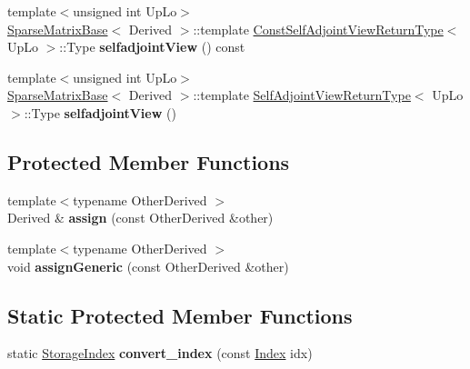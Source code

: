 \begin{DoxyCompactItemize}
\item 
\mbox{\label{class_eigen_1_1_sparse_matrix_base_aa3d27327f5290f7939904557ee81b349}} 
{\footnotesize template$<$unsigned int Up\+Lo$>$ }\\\mbox{\hyperlink{class_eigen_1_1_sparse_matrix_base}{Sparse\+Matrix\+Base}}$<$ Derived $>$\+::template \mbox{\hyperlink{struct_eigen_1_1_sparse_matrix_base_1_1_const_self_adjoint_view_return_type}{Const\+Self\+Adjoint\+View\+Return\+Type}}$<$ Up\+Lo $>$\+::Type {\bfseries selfadjoint\+View} () const
\item 
\mbox{\label{class_eigen_1_1_sparse_matrix_base_a76d3d67a78ef0e319cd2cb5d6e480396}} 
{\footnotesize template$<$unsigned int Up\+Lo$>$ }\\\mbox{\hyperlink{class_eigen_1_1_sparse_matrix_base}{Sparse\+Matrix\+Base}}$<$ Derived $>$\+::template \mbox{\hyperlink{struct_eigen_1_1_sparse_matrix_base_1_1_self_adjoint_view_return_type}{Self\+Adjoint\+View\+Return\+Type}}$<$ Up\+Lo $>$\+::Type {\bfseries selfadjoint\+View} ()
\end{DoxyCompactItemize}
\subsection*{Protected Member Functions}
\begin{DoxyCompactItemize}
\item 
\mbox{\label{class_eigen_1_1_sparse_matrix_base_aa927798f98809d78804bf4f805d94cd8}} 
{\footnotesize template$<$typename Other\+Derived $>$ }\\Derived \& {\bfseries assign} (const Other\+Derived \&other)
\item 
\mbox{\label{class_eigen_1_1_sparse_matrix_base_a4e77da935a1f0699926db9fdd6caf1c3}} 
{\footnotesize template$<$typename Other\+Derived $>$ }\\void {\bfseries assign\+Generic} (const Other\+Derived \&other)
\end{DoxyCompactItemize}
\subsection*{Static Protected Member Functions}
\begin{DoxyCompactItemize}
\item 
\mbox{\label{class_eigen_1_1_sparse_matrix_base_afb07f167dace0de85688250a42acde46}} 
static \mbox{\hyperlink{class_eigen_1_1_sparse_matrix_base_a0b540ba724726ebe953f8c0df06081ed}{Storage\+Index}} {\bfseries convert\+\_\+index} (const \mbox{\hyperlink{struct_eigen_1_1_eigen_base_a554f30542cc2316add4b1ea0a492ff02}{Index}} idx)
\end{DoxyCompactItemize}
